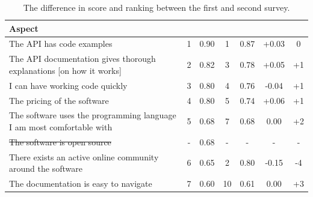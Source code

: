 \documentclass{cslthse-msc}
\begin{document}
    \begin{table}[H]
        \centering
        \caption{The difference in score and ranking between the first and second survey.}
        \label{tab:surveyDiff}
        \begin{tabularx}{\columnwidth}{X|c:c|c:c|c:c|}
            \textbf{Aspect} & \textbf{}&\textbf{}&\textbf{}&\textbf{}&\textbf{} & \textbf{} \\ \hline
            The API has code examples                                             &                        1 & 0.90                      &                        1 & 0.87                       &       +0.03 &         0    \\ \hline
            The API documentation gives thorough explanations [on how it works] &                        2 & 0.82                      &                        3 & 0.78                       &       +0.05 &        +1    \\ \hline
            I can have working code quickly                                       &                        3 & 0.80                      &                        4 & 0.76                       &       -0.04 &        +1    \\ \hline
            The pricing of the software                                           &                        4 & 0.80                      &                        5 & 0.74                       &       +0.06 &        +1    \\ \hline
            The software uses the programming language I am most comfortable with &                        5 & 0.68                      &                        7 & 0.68                       &        0.00 &        +2    \\ \hline
            \sout{The software is open source}                                    &                        - & 0.68                      &                        - & -                          &           - &         -    \\ \hline
            There exists an active online community around the software           &                        6 & 0.65                      &                        2 & 0.80                       &       -0.15 &        -4    \\ \hline
            The documentation is easy to navigate                                 &                        7 & 0.60                      &                       10 & 0.61                       &        0.00 &        +3    \\ \hline

\end{tabularx}
\end{table}
\end{document}
